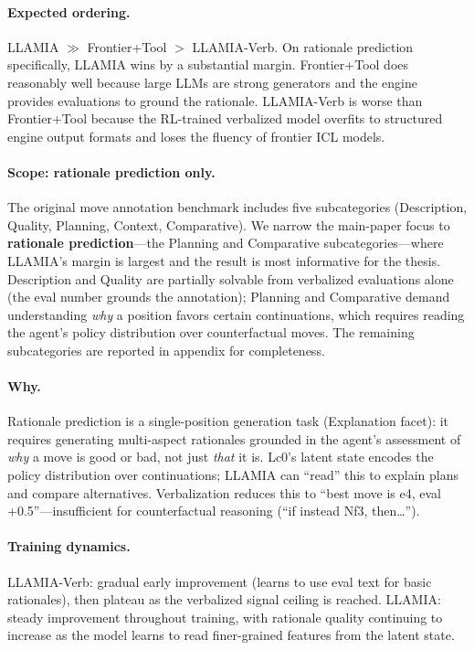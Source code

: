 \paragraph{Expected ordering.}
LLAMIA $\gg$ Frontier+Tool $>$ LLAMIA-Verb. On rationale
prediction specifically, LLAMIA wins by a substantial margin.
Frontier+Tool does reasonably well because large LLMs are strong
generators and the engine provides evaluations to ground the
rationale. LLAMIA-Verb is worse than Frontier+Tool because the
RL-trained verbalized model overfits to structured engine output
formats and loses the fluency of frontier ICL models.

\paragraph{Scope: rationale prediction only.}
The original move annotation benchmark \cite{jhamtani-etal-2018-learning}
includes five subcategories (Description, Quality, Planning,
Context, Comparative). We narrow the main-paper focus to
\textbf{rationale prediction}---the Planning and Comparative
subcategories---where LLAMIA's margin is largest and the result is
most informative for the thesis. Description and Quality are
partially solvable from verbalized evaluations alone (the eval
number grounds the annotation); Planning and Comparative demand
understanding \emph{why} a position favors certain continuations,
which requires reading the agent's policy distribution over
counterfactual moves. The remaining subcategories are reported in
appendix for completeness.

\paragraph{Why.}
Rationale prediction is a single-position generation task
(Explanation facet): it requires
generating multi-aspect rationales grounded in the agent's
assessment of \emph{why} a move is good or bad, not just \emph{that}
it is. Lc0's latent state encodes the policy distribution over
continuations; LLAMIA can ``read'' this to explain plans and compare
alternatives. Verbalization reduces this to ``best move is e4,
eval +0.5''---insufficient for counterfactual reasoning (``if instead
Nf3, then\ldots'').

\paragraph{Training dynamics.}
LLAMIA-Verb: gradual early improvement (learns to use eval text for
basic rationales), then plateau as the verbalized signal ceiling is
reached. LLAMIA: steady improvement throughout training, with
rationale quality continuing to increase as the model learns to read
finer-grained features from the latent state.

